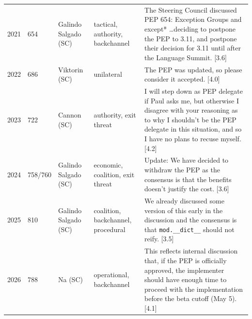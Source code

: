 \begin{table}[t]
\begin{tabular}{p{}p{}p{}p{}p{}}
2021 & 654 & Galindo Salgado (SC) & tactical, authority, backchannel & The Steering Council discussed PEP 654: Exception Groups and except* \ldots deciding to postpone the PEP to 3.11, and postpone their decision for 3.11 until after the Language Summit. [3.6] \\
2022 & 686 & Viktorin (SC) & unilateral & The PEP was updated, so please consider it accepted. [4.0] \\
2023 & 722 & Cannon (SC) & authority, exit threat & I will step down as PEP delegate if Paul asks me, but otherwise I disagree with your reasoning as to why I shouldn't be the PEP delegate in this situation, and so I have no plans to recuse myself. [4.2] \\
2024 & 758/760 & Galindo Salgado (SC) & economic, coalition, exit threat & Update: We have decided to withdraw the PEP as the consensus is that the benefits doesn't justify the cost. [3.6] \\
2025 & 810 & Galindo Salgado (SC) & coalition, backchannel, procedural & We already discussed some version of this early in the discussion and the consensus is that \texttt{mod.\_\_dict\_\_} should not reify. [3.5] \\
2026 & 788 & Na (SC) & operational, backchannel & This reflects internal discussion that, if the PEP is officially approved, the implementer should have enough time to proceed with the implementation before the beta cutoff (May 5). [4.1] \\
\bottomrule
\end{tabular}
\end{table}

